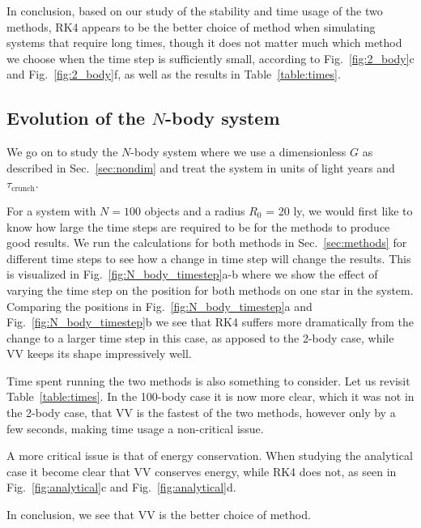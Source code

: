 \documentclass{article}
\begin{document}
\begin{multicols}{2}
In conclusion, based on our study of the stability and time usage of the two methods, RK4 appears to be the better choice of method when simulating systems that require long times, though it does not matter much which method we choose when the time step is sufficiently small, according to Fig.~\ref{fig:2_body}c and Fig.~\ref{fig:2_body}f, as well as the results in Table~\ref{table:times}.



\subsection{Evolution of the $N$-body system}
We go on to study the $N$-body system where we use a dimensionless $G$ as described in Sec.~\ref{sec:nondim} and treat the system in units of light years and $\tau_{\mathrm{crunch}}$. 

For a system with $N = 100$ objects and a radius $R_0$ = 20 ly, we would first like to know how large the time steps are required to be for the methods to produce good results. We run the calculations for both methods in Sec.~\ref{sec:methods} for different time steps to see how a change in time step will change the results. This is visualized in Fig.~\ref{fig:N_body_timestep}a-b where we show the effect of varying the time step on the position for both methods on one star in the system. Comparing the positions in Fig.~\ref{fig:N_body_timestep}a and Fig.~\ref{fig:N_body_timestep}b we see that RK4 suffers more dramatically from the change to a larger time step in this case, as apposed to the 2-body case, while VV keeps its shape impressively well.

Time spent running the two methods is also something to consider. Let us revisit Table~\ref{table:times}. In the 100-body case it is now more clear, which it was not in the 2-body case, that VV is the fastest of the two methods, however only by a few seconds, making time usage a non-critical issue.

A more critical issue is that of energy conservation. When studying the analytical case it become clear that VV conserves energy, while RK4 does not, as seen in Fig.~\ref{fig:analytical}c and Fig.~\ref{fig:analytical}d.

In conclusion, we see that VV is the better choice of method.  \\



\end{multicols}
\end{document}
